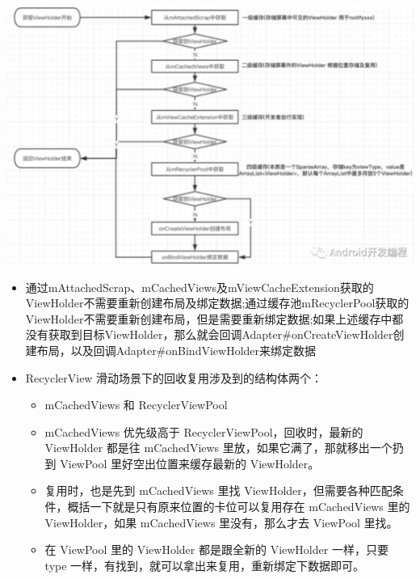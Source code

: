 \documentclass[9pt, b5paper]{article}
\begin{document}
\includegraphics[width=.9\linewidth]{./pic/cache2.png}

\begin{itemize}
\item 通过mAttachedScrap、mCachedViews及mViewCacheExtension获取的ViewHolder不需要重新创建布局及绑定数据;通过缓存池mRecyclerPool获取的ViewHolder不需要重新创建布局，但是需要重新绑定数据;如果上述缓存中都没有获取到目标ViewHolder，那么就会回调Adapter\#onCreateViewHolder创建布局，以及回调Adapter\#onBindViewHolder来绑定数据
\item RecyclerView 滑动场景下的回收复用涉及到的结构体两个：
\begin{itemize}
\item mCachedViews 和 RecyclerViewPool
\item mCachedViews 优先级高于 RecyclerViewPool，回收时，最新的 ViewHolder 都是往 mCachedViews 里放，如果它满了，那就移出一个扔到 ViewPool 里好空出位置来缓存最新的 ViewHolder。
\item 复用时，也是先到 mCachedViews 里找 ViewHolder，但需要各种匹配条件，概括一下就是只有原来位置的卡位可以复用存在 mCachedViews 里的 ViewHolder，如果 mCachedViews 里没有，那么才去 ViewPool 里找。
\item 在 ViewPool 里的 ViewHolder 都是跟全新的 ViewHolder 一样，只要 type 一样，有找到，就可以拿出来复用，重新绑定下数据即可。
\end{itemize}
\end{itemize}
\end{document}
